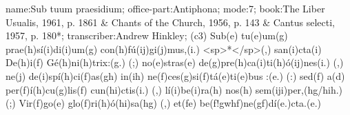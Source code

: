 name:Sub tuum praesidium;
office-part:Antiphona;
mode:7;
book:The Liber Usualis, 1961, p. 1861 & Chants of the Church, 1956, p. 143 & Cantus selecti, 1957, p. 180*;
transcriber:Andrew Hinkley;
(c3) Sub(e) tu(e)um(g) prae(h)sí(i)di(i)um(g) con(h)fú(ij)gi(j)mus,(i.) <sp>*</sp>(,) san(i)cta(i) De(h)i(f) Gé(h)ni(h)trix:(g.) (;) no(e)stras(e) de(g)pre(h)ca(i)ti(h)ó(ij)nes(i.) (,) ne(j) de(i)spí(h)ci(f)as(gh) in(ih) ne(f)ces(g)si(f)tá(e)ti(e)bus :(e.) (:) sed(f) a(d) per(f)í(h)cu(g)lis(f) cun(hi)ctis(i.) (,) lí(i)be(i)ra(h) nos(h) sem(iji)per,(hg/hih.) (;) Vir(f)go(e) glo(f)ri(h)ó(hi)sa(hg) (,) et(fe) be(f!gwhf)ne(gf)dí(e.)cta.(e.)